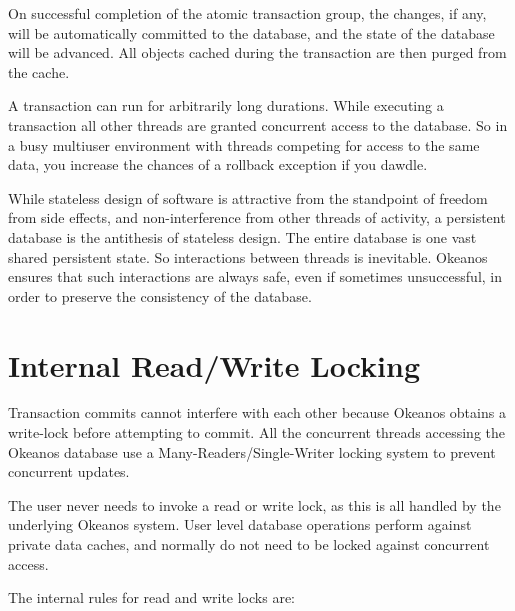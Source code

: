 \documentclass[article,oneside]{memoir}
\begin{document}
On successful completion of the atomic transaction group, the changes, if any, will be automatically committed to the database, and the state of the database will be advanced. All objects cached during the transaction are then purged from the cache.

A transaction can run for arbitrarily long durations. While executing a transaction all other threads are granted concurrent access to the database. So in a busy multiuser environment with threads competing for access to the same data, you increase the chances of a rollback exception if you dawdle.

While stateless design of software is attractive from the standpoint of freedom from side effects, and non-interference from other threads of activity, a persistent database is the antithesis of stateless design. The entire database is one vast shared persistent state. So interactions between threads is inevitable. Okeanos ensures that such interactions are always safe, even if sometimes unsuccessful, in order to preserve the consistency of the database.

\section{Internal Read/Write Locking}
Transaction commits cannot interfere with each other because Okeanos obtains a write-lock before attempting to commit. All the concurrent threads accessing the Okeanos database use a Many-Readers/Single-Writer locking system to prevent concurrent updates. 

The user never needs to invoke a read or write lock, as this is all handled by the underlying Okeanos system. User level database operations perform against private data caches, and normally do not need to be locked against concurrent access.

The internal rules for read and write locks are:
\end{document}
